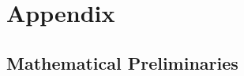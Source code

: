 \documentclass{book}
\begin{document}
% 
%
% 
%
 

%
%  

\part{Appendix}

\appendix

\chapter{Mathematical Preliminaries}\label{sec:math}



\tocentryBib


%
%
%
\end{document}
